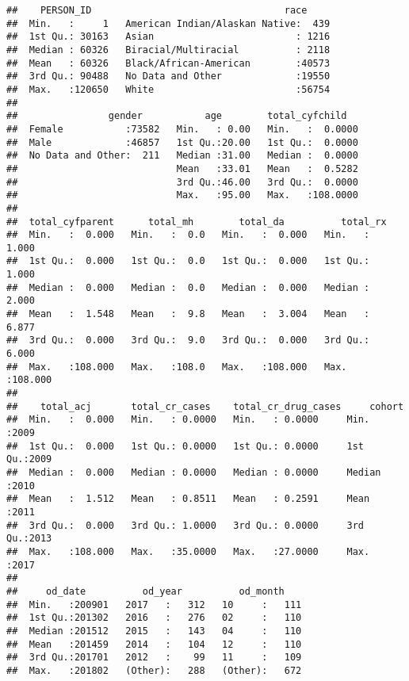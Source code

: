 \documentclass[]{article}
\begin{document}
\begin{verbatim}
##    PERSON_ID                                  race      
##  Min.   :     1   American Indian/Alaskan Native:  439  
##  1st Qu.: 30163   Asian                         : 1216  
##  Median : 60326   Biracial/Multiracial          : 2118  
##  Mean   : 60326   Black/African-American        :40573  
##  3rd Qu.: 90488   No Data and Other             :19550  
##  Max.   :120650   White                         :56754  
##                                                         
##                gender           age        total_cyfchild    
##  Female           :73582   Min.   : 0.00   Min.   :  0.0000  
##  Male             :46857   1st Qu.:20.00   1st Qu.:  0.0000  
##  No Data and Other:  211   Median :31.00   Median :  0.0000  
##                            Mean   :33.01   Mean   :  0.5282  
##                            3rd Qu.:46.00   3rd Qu.:  0.0000  
##                            Max.   :95.00   Max.   :108.0000  
##                                                              
##  total_cyfparent      total_mh        total_da          total_rx      
##  Min.   :  0.000   Min.   :  0.0   Min.   :  0.000   Min.   :  1.000  
##  1st Qu.:  0.000   1st Qu.:  0.0   1st Qu.:  0.000   1st Qu.:  1.000  
##  Median :  0.000   Median :  0.0   Median :  0.000   Median :  2.000  
##  Mean   :  1.548   Mean   :  9.8   Mean   :  3.004   Mean   :  6.877  
##  3rd Qu.:  0.000   3rd Qu.:  9.0   3rd Qu.:  0.000   3rd Qu.:  6.000  
##  Max.   :108.000   Max.   :108.0   Max.   :108.000   Max.   :108.000  
##                                                                       
##    total_acj       total_cr_cases    total_cr_drug_cases     cohort    
##  Min.   :  0.000   Min.   : 0.0000   Min.   : 0.0000     Min.   :2009  
##  1st Qu.:  0.000   1st Qu.: 0.0000   1st Qu.: 0.0000     1st Qu.:2009  
##  Median :  0.000   Median : 0.0000   Median : 0.0000     Median :2010  
##  Mean   :  1.512   Mean   : 0.8511   Mean   : 0.2591     Mean   :2011  
##  3rd Qu.:  0.000   3rd Qu.: 1.0000   3rd Qu.: 0.0000     3rd Qu.:2013  
##  Max.   :108.000   Max.   :35.0000   Max.   :27.0000     Max.   :2017  
##                                                                        
##     od_date          od_year          od_month     
##  Min.   :200901   2017   :   312   10     :   111  
##  1st Qu.:201302   2016   :   276   02     :   110  
##  Median :201512   2015   :   143   04     :   110  
##  Mean   :201459   2014   :   104   12     :   110  
##  3rd Qu.:201701   2012   :    99   11     :   109  
##  Max.   :201802   (Other):   288   (Other):   672  

\end{verbatim}
\end{document}
